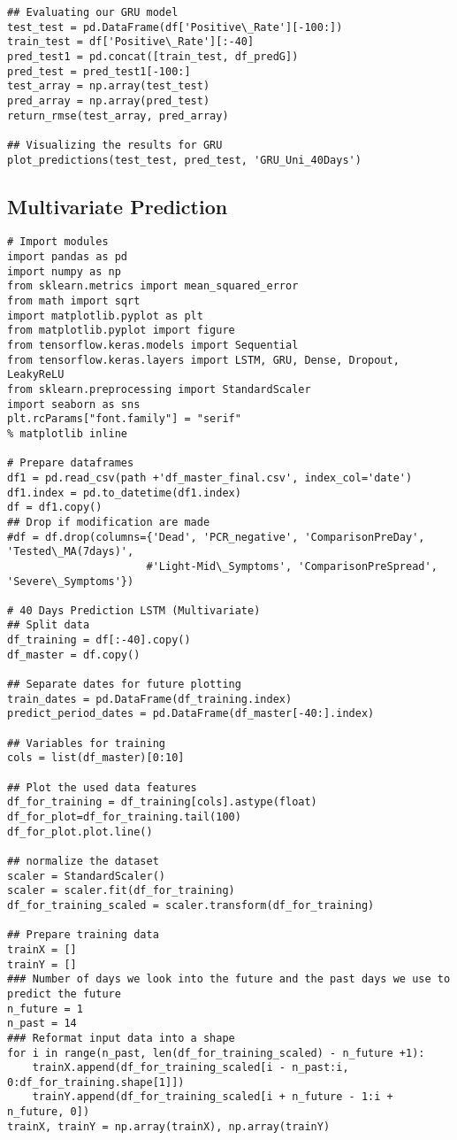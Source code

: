 \begin{appendices}
\begin{verbatim}
## Evaluating our GRU model
test_test = pd.DataFrame(df['Positive\_Rate'][-100:])
train_test = df['Positive\_Rate'][:-40]
pred_test1 = pd.concat([train_test, df_predG])
pred_test = pred_test1[-100:]
test_array = np.array(test_test)
pred_array = np.array(pred_test)
return_rmse(test_array, pred_array)

## Visualizing the results for GRU
plot_predictions(test_test, pred_test, 'GRU_Uni_40Days')
\end{verbatim}

\subsection{Multivariate Prediction}
\begin{verbatim}
# Import modules
import pandas as pd
import numpy as np
from sklearn.metrics import mean_squared_error
from math import sqrt
import matplotlib.pyplot as plt
from matplotlib.pyplot import figure
from tensorflow.keras.models import Sequential
from tensorflow.keras.layers import LSTM, GRU, Dense, Dropout, LeakyReLU
from sklearn.preprocessing import StandardScaler
import seaborn as sns
plt.rcParams["font.family"] = "serif"
% matplotlib inline

# Prepare dataframes
df1 = pd.read_csv(path +'df_master_final.csv', index_col='date')
df1.index = pd.to_datetime(df1.index)
df = df1.copy()
## Drop if modification are made
#df = df.drop(columns={'Dead', 'PCR_negative', 'ComparisonPreDay', 'Tested\_MA(7days)', 
                      #'Light-Mid\_Symptoms', 'ComparisonPreSpread', 'Severe\_Symptoms'})

# 40 Days Prediction LSTM (Multivariate)
## Split data
df_training = df[:-40].copy()
df_master = df.copy()

## Separate dates for future plotting
train_dates = pd.DataFrame(df_training.index)
predict_period_dates = pd.DataFrame(df_master[-40:].index)

## Variables for training
cols = list(df_master)[0:10]

## Plot the used data features
df_for_training = df_training[cols].astype(float)
df_for_plot=df_for_training.tail(100)
df_for_plot.plot.line()

## normalize the dataset
scaler = StandardScaler()
scaler = scaler.fit(df_for_training)
df_for_training_scaled = scaler.transform(df_for_training)

## Prepare training data
trainX = []
trainY = []
### Number of days we look into the future and the past days we use to predict the future
n_future = 1
n_past = 14 
### Reformat input data into a shape
for i in range(n_past, len(df_for_training_scaled) - n_future +1):
    trainX.append(df_for_training_scaled[i - n_past:i, 0:df_for_training.shape[1]])
    trainY.append(df_for_training_scaled[i + n_future - 1:i + n_future, 0])
trainX, trainY = np.array(trainX), np.array(trainY)


\end{verbatim}
\end{appendices}
